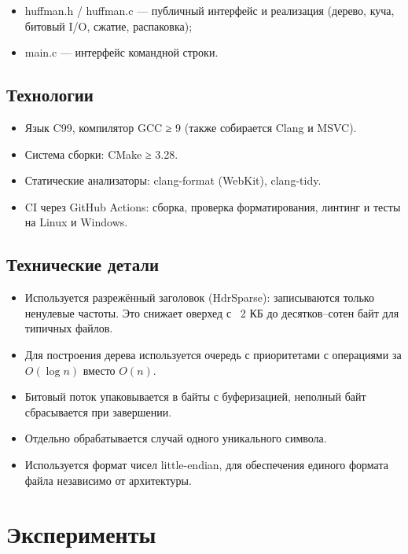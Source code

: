 \documentclass[a4paper]{article}
\begin{document}
\begin{itemize}
    \item huffman.h / huffman.c — публичный интерфейс и реализация (дерево, куча, битовый I/O, сжатие, распаковка);
    \item main.c — интерфейс командной строки.
\end{itemize}

\subsection{Технологии}

\begin{itemize}
    \item Язык C99, компилятор GCC ≥ 9 (также собирается Clang и MSVC).
    \item Система сборки: CMake ≥ 3.28.
    \item Статические анализаторы: clang-format (WebKit), clang-tidy.
    \item CI через GitHub Actions: сборка, проверка форматирования, линтинг и тесты на Linux и Windows.
\end{itemize}

\subsection{Технические детали}

\begin{itemize}
    \item Используется разрежённый заголовок (HdrSparse): записываются только ненулевые частоты. Это снижает оверхед с ~2 КБ до десятков–сотен байт для типичных файлов.
    \item Для построения дерева используется очередь с приоритетами с операциями за $O(\log n)$ вместо $O(n)$.
    \item Битовый поток упаковывается в байты с буферизацией, неполный байт сбрасывается при завершении.
    \item Отдельно обрабатывается случай одного уникального символа.
    \item Используется формат чисел little-endian, для обеспечения единого формата файла независимо от архитектуры.
\end{itemize}

\section{Эксперименты}

\end{document}
